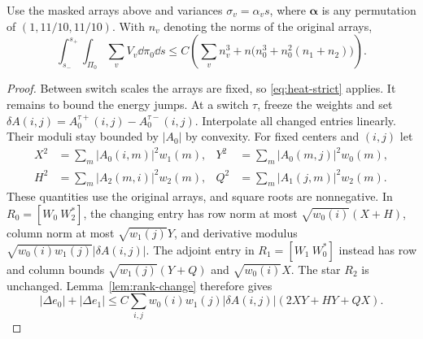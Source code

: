 \begin{lemma}\label{lem:repeated-dissipation}
Use the masked arrays above and variances $\sigma_v=\alpha_vs$, where
$\boldsymbol\alpha$ is any permutation of $(1,11/10,11/10)$.
With $n_v$ denoting the norms of the original arrays,
\begin{equation}\label{eq:repeated-dissipation}
 \int_{s_-}^{s_+}\int_{\Pi_0}\sum_vV_v\dd\pi_0\dd s
 \le C\left(\sum_vn_v^3+n\bigl(n_0^3+n_0^2(n_1+n_2)\bigr)\right).
\end{equation}
\end{lemma}
\begin{proof}
Between switch scales the arrays are fixed, so
\eqref{eq:heat-strict} applies. It remains to bound the energy jumps.
At a switch $\tau$, freeze the weights and set
$\delta A(i,j)=A_0^{\tau+}(i,j)-A_0^{\tau-}(i,j)$.
Interpolate all changed entries linearly. Their moduli stay bounded
by $|A_0|$ by convexity. For fixed centers and $(i,j)$ let
\begin{align*}
 X^2&=\sum_m|A_0(i,m)|^2w_1(m),&
 Y^2&=\sum_m|A_0(m,j)|^2w_0(m),\\
 H^2&=\sum_m|A_2(m,i)|^2w_2(m),&
 Q^2&=\sum_m|A_1(j,m)|^2w_2(m).
\end{align*}
These quantities use the original arrays, and square roots are
nonnegative. In $R_0=[W_0\ W_2^*]$, the changing entry has row norm
at most $\sqrt{w_0(i)}(X+H)$, column norm at most
$\sqrt{w_1(j)}Y$, and derivative modulus
$\sqrt{w_0(i)w_1(j)}|\delta A(i,j)|$.
The adjoint entry in $R_1=[W_1\ W_0^*]$ instead has row and column
bounds $\sqrt{w_1(j)}(Y+Q)$ and $\sqrt{w_0(i)}X$.
The star $R_2$ is unchanged. Lemma~\ref{lem:rank-change} therefore gives
\begin{equation}\label{eq:switch-entry-bound}
 |\Delta e_0|+|\Delta e_1|
 \le C\sum_{i,j}w_0(i)w_1(j)|\delta A(i,j)|
                    (2XY+HY+QX).
\end{equation}


\end{proof}
